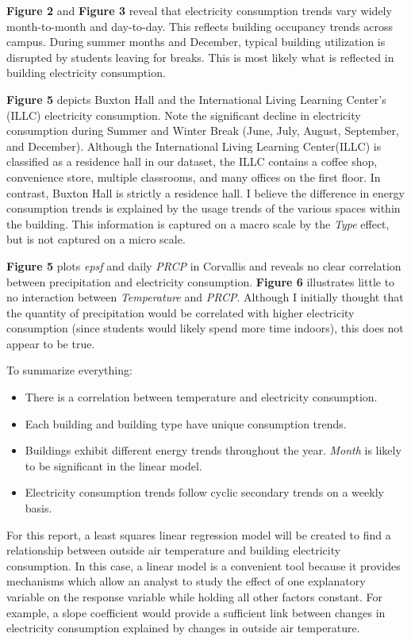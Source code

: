 \documentclass[
]{article}
\providecommand{\tightlist}{%
  \setlength{\itemsep}{0pt}\setlength{\parskip}{0pt}}
\begin{document}
\textbf{Figure 2} and \textbf{Figure 3} reveal that electricity
consumption trends vary widely month-to-month and day-to-day. This
reflects building occupancy trends across campus. During summer months
and December, typical building utilization is disrupted by students
leaving for breaks. This is most likely what is reflected in building
electricity consumption.

\textbf{Figure 5} depicts Buxton Hall and the International Living
Learning Center's (ILLC) electricity consumption. Note the significant
decline in electricity consumption during Summer and Winter Break (June,
July, August, September, and December). Although the International
Living Learning Center(ILLC) is classified as a residence hall in our
dataset, the ILLC contains a coffee shop, convenience store, multiple
classrooms, and many offices on the first floor. In contrast, Buxton
Hall is strictly a residence hall. I believe the difference in energy
consumption trends is explained by the usage trends of the various
spaces within the building. This information is captured on a macro
scale by the \emph{Type} effect, but is not captured on a micro scale.

\textbf{Figure 5} plots \emph{epsf} and daily \emph{PRCP} in Corvallis
and reveals no clear correlation between precipitation and electricity
consumption. \textbf{Figure 6} illustrates little to no interaction
between \emph{Temperature} and \emph{PRCP}. Although I initially thought
that the quantity of precipitation would be correlated with higher
electricity consumption (since students would likely spend more time
indoors), this does not appear to be true.

To summarize everything:

\begin{itemize}
\tightlist
\item
  There is a correlation between temperature and electricity
  consumption.
\item
  Each building and building type have unique consumption trends.
\item
  Buildings exhibit different energy trends throughout the year.
  \emph{Month} is likely to be significant in the linear model.
\item
  Electricity consumption trends follow cyclic secondary trends on a
  weekly basis.
\end{itemize}

For this report, a least squares linear regression model will be created
to find a relationship between outside air temperature and building
electricity consumption. In this case, a linear model is a convenient
tool because it provides mechanisms which allow an analyst to study the
effect of one explanatory variable on the response variable while
holding all other factors constant. For example, a slope coefficient
would provide a sufficient link between changes in electricity
consumption explained by changes in outside air temperature.
\end{document}
